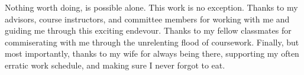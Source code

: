 \begin{acknowledgements}
Nothing worth doing, is possible alone.  This work is no exception.  Thanks to
my advisors, course instructors, and committee members for working with me and
guiding me through this exciting endevour.  Thanks to my fellow classmates for
commiserating with me through the unrelenting flood of coursework.  Finally,
but most importantly, thanks to my wife for always being there, supporting my
often erratic work schedule, and making sure I never forgot to eat.  
\end{acknowledgements}
